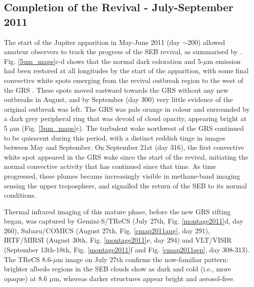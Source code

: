 \documentclass[final,authoryear,5p,times,twocolumn]{elsarticle}
\begin{document}
\subsection{Completion of the Revival - July-September 2011}
\label{seq4}

The start of the Jupiter apparition in May-June 2011 (day $\sim200$) allowed amateur observers to track the progress of the SEB revival, as summarised by \citet{15rogers, 16rogers}.  Fig. \ref{5um_maps}c-d shows that the normal dark coloration and 5-$\mu$m emission had been restored at all longitudes by the start of the apparition, with some final convective white spots emerging from the revival outbreak region to the west of the GRS \citep{15rogers}.  These spots moved eastward towards the GRS without any new outbreaks in August, and by September (day 300) very little evidence of the original outbreak was left.  The GRS was pale orange in colour and surrounded by a dark grey peripheral ring that was devoid of cloud opacity, appearing bright at 5 $\mu$m (Fig. \ref{5um_maps}c).  The turbulent wake northwest of the GRS continued to be quiescent during this period, with a distinct reddish tinge in images between May and September.  On September 21st (day 316), the first convective white spot appeared in the GRS wake since the start of the revival, initiating the normal convective activity that has continued since that time.  As time progressed, these plumes became increasingly visible in methane-band imaging sensing the upper troposphere, and signalled the return of the SEB to its normal conditions.

Thermal infrared imaging of this mature phase, before the new GRS rifting began, was captured by Gemini-S/TReCS (July 27th, Fig. \ref{montage2011}d, day 260), Subaru/COMICS (August 27th, Fig. \ref{cmap2011aug}, day 291), IRTF/MIRSI (August 30th, Fig. \ref{montage2011}e, day 294) and VLT/VISIR (September 13th-18th, Fig. \ref{montage2011}f and Fig. \ref{cmap2011sep}, day 308-313).  The TReCS 8.6-$\mu$m image on July 27th confirms the now-familiar pattern: brighter albedo regions in the SEB clouds show as dark and cold (i.e., more opaque) at 8.6 $\mu$m, whereas darker structures appear bright and aerosol-free. 
\end{document}
